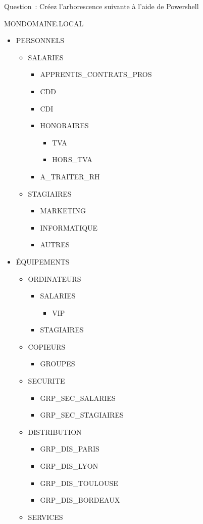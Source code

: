 \newpage

Question~: Créez l'arborescence suivante à l'aide de Powershell

\noindent MONDOMAINE.LOCAL
\begin{itemize}
	\item PERSONNELS
	\begin{itemize}
		\item SALARIES
		\begin{itemize}
			\item APPRENTIS\_CONTRATS\_PROS
			\item CDD
			\item CDI
			\item HONORAIRES
			\begin{itemize}
				\item TVA
				\item HORS\_TVA
			\end{itemize}
			\item A\_TRAITER\_RH
		\end{itemize}
		\item STAGIAIRES
		\begin{itemize}
			\item MARKETING
			\item INFORMATIQUE
			\item AUTRES
		\end{itemize}
		\end{itemize}
	\item ÉQUIPEMENTS
	\begin{itemize}
		\item ORDINATEURS
		\begin{itemize}
			\item SALARIES
			\begin{itemize}
				\item VIP
			\end{itemize} 
			\item STAGIAIRES
		\end{itemize}
		\item COPIEURS
		\begin{itemize}
			\item GROUPES
		\end{itemize}
		\item SECURITE
		\begin{itemize}
			\item GRP\_SEC\_SALARIES
			\item GRP\_SEC\_STAGIAIRES
		\end{itemize}
		\item DISTRIBUTION
		\begin{itemize}
			\item GRP\_DIS\_PARIS
			\item GRP\_DIS\_LYON
			\item GRP\_DIS\_TOULOUSE
			\item GRP\_DIS\_BORDEAUX
		\end{itemize}
		\item SERVICES
	\end{itemize}
\end{itemize}

